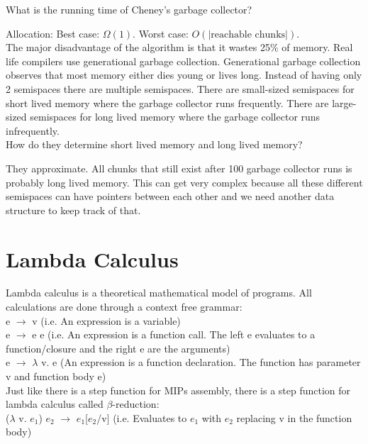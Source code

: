 \documentclass[12pt, letterpaper]{article}
\begin{document}
What is the running time of Cheney's garbage collector?

Allocation: Best case: \(\Omega(1)\). Worst case: \(O(\vert \text{reachable chunks} \vert)\).\\

The major disadvantage of the algorithm is that it wastes 25\% of memory. Real life compilers use generational garbage collection. Generational garbage collection observes that most memory either dies young or lives long. Instead of having only 2 semispaces there are multiple semispaces. There are small-sized semispaces for short lived memory where the garbage collector runs frequently. There are large-sized semispaces for long lived memory where the garbage collector runs infrequently.\\

How do they determine short lived memory and long lived memory?

They approximate. All chunks that still exist after 100 garbage collector runs is probably long lived memory. This can get very complex because all these different semispaces can have pointers between each other and we need another data structure to keep track of that.

\newpage

\section{Lambda Calculus}
Lambda calculus is a theoretical mathematical model of programs. All calculations are done through a context free grammar:\\

e \(\rightarrow\) v (i.e. An expression is a variable)\\
e \(\rightarrow\) e e (i.e. An expression is a function call. The left e evaluates to a function/closure and the right e are the arguments) \\
e \(\rightarrow\) \(\lambda\) v. e (An expression is a function declaration. The function has parameter v and function body e)\\

Just like there is a step function for MIPs assembly, there is a step function for lambda calculus called \(\beta\)-reduction:\\

(\(\lambda\) v. \(e_1\)) \(e_2\) \(\rightarrow\) \(e_1\)[\(e_2\)/v] (i.e. Evaluates to \(e_1\) with \(e_2\) replacing v in the function body)\\
\end{document}
